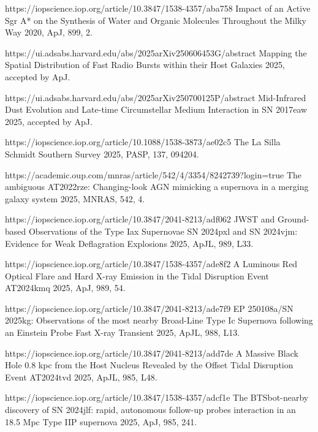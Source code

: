 \begin{cvpubs}
\begin{cvpubitems}
{}
{https://iopscience.iop.org/article/10.3847/1538-4357/aba758}
{Impact of an Active Sgr A* on the Synthesis of Water and Organic Molecules Throughout the Milky Way}
{2020, ApJ, 899, 2.}


{\Cliu}
{https://ui.adsabs.harvard.edu/abs/2025arXiv250606453G/abstract}
{Mapping the Spatial Distribution of Fast Radio Bursts within their Host Galaxies}
{2025, accepted by ApJ.}

{\Cliu}
{https://ui.adsabs.harvard.edu/abs/2025arXiv250700125P/abstract}
{Mid-Infrared Dust Evolution and Late-time Circumstellar Medium Interaction in SN 2017eaw}
{2025, accepted by ApJ.}

{\Cliu}
{https://iopscience.iop.org/article/10.1088/1538-3873/ae02c5}
{The La Silla Schmidt Southern Survey}
{2025, PASP, 137, 094204.}

{\Cliu}
{https://academic.oup.com/mnras/article/542/4/3354/8242739?login=true}
{The ambiguous AT2022rze: Changing-look AGN mimicking a supernova in a merging galaxy system}
{2025, MNRAS, 542, 4.}

{\Cliu}
{https://iopscience.iop.org/article/10.3847/2041-8213/adf062}
{JWST and Ground-based Observations of the Type Iax Supernovae SN 2024pxl and SN 2024vjm: Evidence for Weak Deflagration Explosions}
{2025, ApJL, 989, L33.}

{\Cliu}
{https://iopscience.iop.org/article/10.3847/1538-4357/ade8f2}
{A Luminous Red Optical Flare and Hard X-ray Emission in the Tidal Disruption Event AT2024kmq}
{2025, ApJ, 989, 54.}

{\Cliu}
{https://iopscience.iop.org/article/10.3847/2041-8213/ade7f9}
{EP 250108a/SN 2025kg: Observations of the most nearby Broad-Line Type Ic Supernova following an Einstein Probe Fast X-ray Transient}
{2025, ApJL, 988, L13.}

{\Cliu}
{https://iopscience.iop.org/article/10.3847/2041-8213/add7de}
{A Massive Black Hole 0.8 kpc from the Host Nucleus Revealed by the Offset Tidal Disruption Event AT2024tvd}
{2025, ApJL, 985, L48.}

{\Cliu}
{https://iopscience.iop.org/article/10.3847/1538-4357/adcf1e}
{The BTSbot-nearby discovery of SN 2024jlf: rapid, autonomous follow-up probes interaction in an 18.5 Mpc Type IIP supernova}
{2025, ApJ, 985, 241.}


\end{cvpubitems}
\end{cvpubs}
